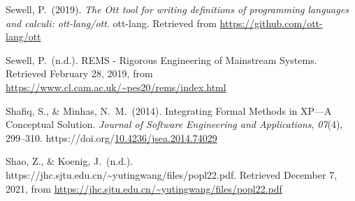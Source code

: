 \documentclass[12pt,twoside]{article}
\begin{document}
{\begin{thebibliography}{1079}
\mdbibitemlabel{}Sewell, P.~(2019). \emph{The Ott tool for writing definitions of programming languages and calculi: ott-lang/ott}. ott-lang. Retrieved from \href{https://github.com/ott-lang/ott}{{\ttfamily https://\hspace{0pt}github.\hspace{0pt}com/\hspace{0pt}ott-\hspace{0pt}lang/\hspace{0pt}ott}}%

\mdbibitemlabel{}Sewell, P.~(n.d.). REMS - Rigorous Engineering of Mainstream Systems. Retrieved February 28, 2019, from \href{https://www.cl.cam.ac.uk/~pes20/rems/index.html}{{\ttfamily https://\hspace{0pt}www.\hspace{0pt}cl.\hspace{0pt}cam.\hspace{0pt}ac.\hspace{0pt}uk/\hspace{0pt}\textasciitilde{}pes20/\hspace{0pt}rems/\hspace{0pt}index.\hspace{0pt}html}}%

\mdbibitemlabel{}Shafiq, S., \& Minhas, N.~M.~(2014). Integrating Formal Methods in XP—A Conceptual Solution. \emph{Journal of Software Engineering and Applications}, \emph{07}(4), 299–310. https://doi.org/\href{https://dx.doi.org/10.4236/jsea.2014.74029}{10.4236/jsea.2014.74029}%

\mdbibitemlabel{}Shao, Z., \& Koenig, J.~(n.d.). https://jhc.sjtu.edu.cn/\textasciitilde{}yutingwang/files/popl22.pdf. Retrieved December 7, 2021, from \href{https://jhc.sjtu.edu.cn/~yutingwang/files/popl22.pdf}{{\ttfamily https://\hspace{0pt}jhc.\hspace{0pt}sjtu.\hspace{0pt}edu.\hspace{0pt}cn/\hspace{0pt}\textasciitilde{}yutingwang/\hspace{0pt}files/\hspace{0pt}popl22.\hspace{0pt}pdf}}%


\end{thebibliography}}
\end{document}
